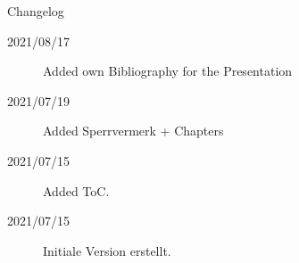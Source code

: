 %	
%
\begin{frame}{Changelog}
	\begin{description}
		\item[2021/08/17] Added own Bibliography for the Presentation
		\item[2021/07/19] Added Sperrvermerk + Chapters
		\item[2021/07/15] Added ToC.
		\item[2021/07/15] Initiale Version erstellt.
	\end{description}
\end{frame}